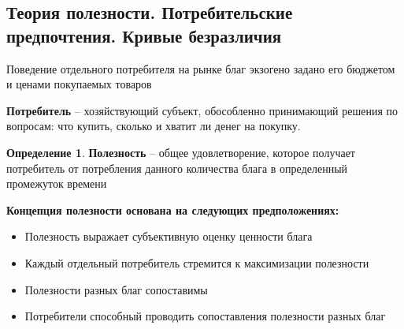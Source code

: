 \documentclass[reqno]{article}
\theoremstyle{definition}
\theoremstyle{definition}
\theoremstyle{definition}
\theoremstyle{definition}
\theoremstyle{definition}
\theoremstyle{definition}
\theoremstyle{definition}
\newtheorem*{defi}{Определение}
\theoremstyle{definition}
\theoremstyle{definition}
\begin{document}
		
		
		
		
		
		
		
		
		
		
		\subsection{Теория полезности. Потребительские предпочтения. Кривые безразличия}
				Поведение отдельного потребителя на рынке благ экзогено задано его бюджетом и ценами покупаемых товаров
				
			\textbf{Потребитель} -- хозяйствующий субъект, обособленно принимающий решения по вопросам: что купить, сколько и хватит ли денег на покупку.
			
			\begin{defi}
				\textbf{Полезность} -- общее удовлетворение, которое получает потребитель от потребления данного количества блага в определенный промежуток времени
			\end{defi}
		
			\textbf{Концепция полезности основана на следующих предположениях:}
			
			\begin{itemize}
				\item Полезность выражает субъективную оценку ценности блага
				
				\item Каждый отдельный потребитель стремится к максимизации полезности
				
				\item Полезности разных благ сопоставимы
				
				\item Потребители способный проводить сопоставления полезности разных благ
				
			\end{itemize}
		
\end{document}
